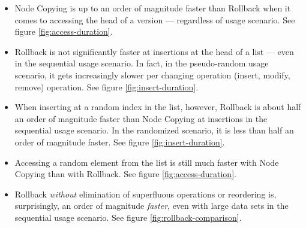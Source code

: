 \begin{itemize}
  \item Node Copying is up to an order of magnitude faster than Rollback
  when it comes to accessing the head of a version --- regardless of usage
  scenario. See figure \ref{fig:access-duration}.

  \item Rollback is not significantly faster at insertions at the head of a list
  --- even in the sequential usage scenario. In fact, in the pseudo-random usage
  scenario, it gets increasingly slower per changing operation (insert, modify,
  remove) operation. See figure \ref{fig:insert-duration}.

  \item When inserting at a random index in the list, however, Rollback is about
  half an order of magnitude faster than Node Copying at insertions in the
  sequential usage scenario. In the randomized scenario, it is less than half an
  order of magnitude faster. See figure \ref{fig:insert-duration}.

  \item Accessing a random element from the list is still much faster with Node
  Copying than with Rollback. See figure \ref{fig:access-duration}.

  \item Rollback \emph{without} elimination of superfluous operations or
  reordering is, surprisingly, an order of magnitude \emph{faster}, even with
  large data sets in the sequential usage scenario. See figure
  \ref{fig:rollback-comparison}.

\end{itemize}


